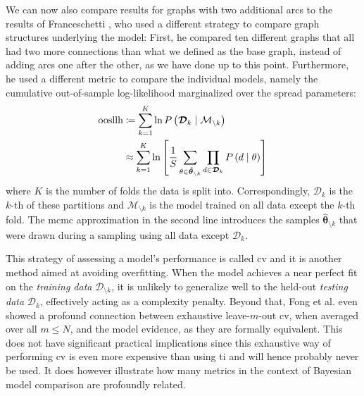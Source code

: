 \documentclass[\relativeRoot/main.tex]{subfiles}
\begin{document}
We can now also compare results for graphs with two additional arcs to the results of Franceschetti \cite{franceschetti_comparison_2022}, who used a different strategy to compare graph structures underlying the model: First, he compared ten different graphs that all had two more connections than what we defined as the base graph, instead of adding arcs one after the other, as we have done up to this point. Furthermore, he used a different metric to compare the individual models, namely the cumulative out-of-sample log-likelihood marginalized over the spread parameters:
%
\begin{equation} \label{eq:cross_validation}
    \begin{aligned}
        \text{oosllh} &\coloneqq \sum_{k=1}^K{\ln{ P \left( \boldsymbol{\mathcal{D}}_k \mid \mathcal{M}_{\setminus k} \right) }} \\
        &\approx \sum_{k=1}^K{\ln{ \left[ \frac{1}{S} \sum_{\theta \in \boldsymbol{\hat{\theta}}_{\setminus k}}{ \prod_{d \in \boldsymbol{\mathcal{D}}_k}{ P \left( d \mid \theta \right) } } \right] }}
    \end{aligned}
\end{equation}
%
where $K$ is the number of folds the data is split into. Correspondingly, $\boldsymbol{\mathcal{D}}_k$ is the $k$-th of these partitions and $\mathcal{M}_{\setminus k}$ is the model trained on all data except the $k$-th fold. The \gls{mcmc} approximation in the second line introduces the samples $\boldsymbol{\hat{\theta}}_{\setminus k}$ that were drawn during a sampling using all data except $\boldsymbol{\mathcal{D}}_k$.

This strategy of assessing a model's performance is called \gls{cv} and it is another method aimed at avoiding overfitting. When the model achieves a near perfect fit on the \emph{training data} $\boldsymbol{\mathcal{D}}_{\setminus k}$, it is unlikely to generalize well to the held-out \emph{testing data} $\boldsymbol{\mathcal{D}}_k$, effectively acting as a complexity penalty. Beyond that, Fong et al. \cite{fong_marginal_2019} even showed a profound connection between exhaustive leave-$m$-out \gls{cv}, when averaged over all $m \leq N$, and the model evidence, as they are formally equivalent. This does not have significant practical implications since this exhaustive way of performing \gls{cv} is even more expensive than using \acrlong{ti} and will hence probably never be used. It does however illustrate how many metrics in the context of Bayesian model comparison are profoundly related.
\end{document}
